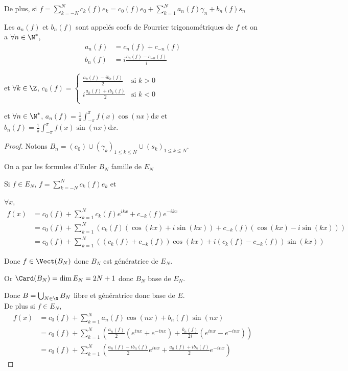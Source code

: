 De plus, si $\displaystyle f = \sum_{k = -N }^{N } c_k(f) e_k = c_0(f)e_0 + \sum_{k=1}^N a_n(f) \gamma_n + b_n(f) s_n$

Les $a_n(f)$ et $b_n(f)$ sont appelés coefs de Fourrier trigonométriques de $f$ et on a 
$\forall n \in \N^*$,
\begin{align}
    a_n(f) & = c_n(f) + c_{-n}(f) \\
    b_n(f) & = i \frac{c_n(f) - c_{-n}(f)} i
\end{align}

et $\forall k \in \Z$, $c_k(f) = \left\{ \begin{matrix}
    \frac{a_k(f) - ib_k(f)}{2} & \text{si } k > 0 \\
    i \frac{a_k(f) + ib_k(f) }{2 } & \text{si } k < 0 \\
\end{matrix} \right.$

et $\forall n \in \N^*$, $a_n(f) = \frac 1 \pi \int_{- \pi }^\pi f(x) \cos(nx) \mathrm{d}x$ et
$b_n(f) = \frac 1 \pi \int_{- \pi }^\pi f(x) \sin(nx) \mathrm{d}x$.

\begin{proof}
    Notons $B_n = (e_0) \cup (\gamma_k)_{1 \leqslant k \leqslant N} \cup (s_k)_{1 \leqslant k \leqslant N}$.

    On a par les formules d'Euler $B_N$ famille de $E_N$

    Si $f \in E_N$, $f = \sum_{k=-N}^N c_k(f) e_k$ et 

    $\forall x , $
    \begin{align}
            f(x) & = c_0(f) + \sum_{k=1}^N c_k(f) e^{ikx} + c_{-k}(f) e^{-ikx} \\
            & = c_0(f) + \sum_{k=1}^N \left( c_k(f) (\cos(kx) + i \sin(kx)) + c_{-k}(f) (\cos(kx) - i \sin(kx)) \right) \\
            & = c_0(f) + \sum_{k=1}^N \left( (c_k(f) + c_{-k}(f)) \cos(kx) + i (c_k(f) - c_{-k}(f)) \sin(kx) \right)
    \end{align}

    Donc $f \in \Vect (B_N)$ donc $B_N$ est génératrice de $E_N$.

    Or $\Card (B_N) = \dim E_N = 2N + 1$ donc $B_N$ base de $E_N$.

    Donc $B = \bigcup_{N \in \N} B_N$ libre et génératrice donc base de $E$.\\
    De plus si $f \in E_N$, 
    \begin{align}
        f(x) & = c_0(f) + \sum_{k=1}^N a_n(f) \cos(nx) + b_n(f) \sin(nx) \\
        & = c_0(f) + \sum_{k=1}^N \left( \frac{a_n(f)}{2} (e^{inx} + e^{-inx}) + \frac{b_n(f)}{2i} (e^{inx} - e^{-inx}) \right) \\
        & = c_0(f) + \sum_{k=1}^N \left( \frac{a_n(f) - i b_n(f)}{2 } e^{inx} + \frac{a_n(f) + i b_n(f)}{2 } e^{-inx} \right)
    \end{align}
\end{proof}

